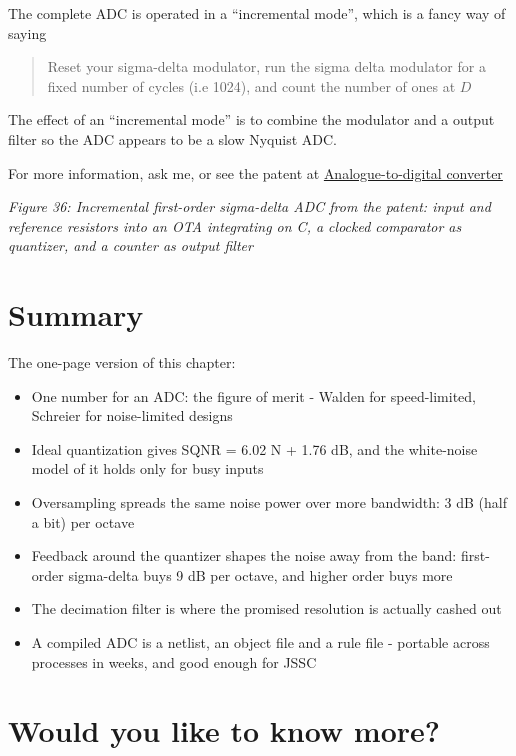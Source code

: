 The complete ADC is operated in a ``incremental mode'', which is a fancy
way of saying

\begin{quote}
Reset your sigma-delta modulator, run the sigma delta modulator for a
fixed number of cycles (i.e 1024), and count the number of ones at \(D\)
\end{quote}

The effect of an ``incremental mode'' is to combine the modulator and a
output filter so the ADC appears to be a slow Nyquist ADC.

For more information, ask me, or see the patent at
\href{https://patents.google.com/patent/US8947280B2/en?inventor=carsten+wulff&oq=carsten+wulff}{Analogue-to-digital
converter}


{
\centering
{}
}

\emph{Figure 36: Incremental first-order sigma-delta ADC from the
patent: input and reference resistors into an OTA integrating on C, a
clocked comparator as quantizer, and a counter as output filter}

\section{Summary}\label{summary}

The one-page version of this chapter:

\begin{itemize}
\tightlist
\item
  One number for an ADC: the figure of merit - Walden for speed-limited,
  Schreier for noise-limited designs
\item
  Ideal quantization gives SQNR = 6.02 N + 1.76 dB, and the white-noise
  model of it holds only for busy inputs
\item
  Oversampling spreads the same noise power over more bandwidth: 3 dB
  (half a bit) per octave
\item
  Feedback around the quantizer shapes the noise away from the band:
  first-order sigma-delta buys 9 dB per octave, and higher order buys
  more
\item
  The decimation filter is where the promised resolution is actually
  cashed out
\item
  A compiled ADC is a netlist, an object file and a rule file - portable
  across processes in weeks, and good enough for JSSC
\end{itemize}

\section{Would you like to know
more?}\label{would-you-like-to-know-more}


